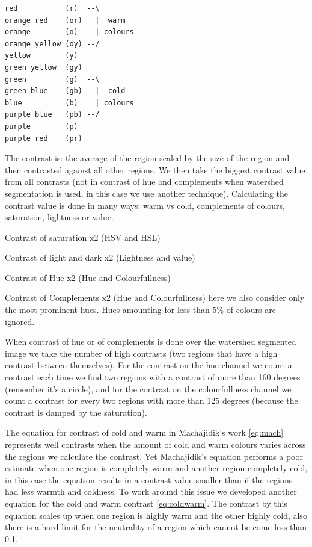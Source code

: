 \documentclass[11pt,a4paper,draft]{report}
\begin{document}
\begin{multicols}{2}
\begin{verbatim}
red           (r)  --\
orange red    (or)   |  warm
orange        (o)    | colours
orange yellow (oy) --/
yellow        (y)
green yellow  (gy)
green         (g)  --\
green blue    (gb)   |  cold
blue          (b)    | colours
purple blue   (pb) --/
purple        (p)
purple red    (pr)
\end{verbatim}


The contrast is: the average of the region scaled by the size of the region and
then contrasted against all other regions.  We then take the biggest contrast
value from all contrasts (not in contrast of hue and complements when watershed
segmentation is used, in this case we use another technique).  Calculating the
contrast value is done in many ways: warm vs cold, complements of colours,
saturation, lightness or value.

Contrast of saturation x2 (HSV and HSL)

Contrast of light and dark x2 (Lightness and value)

Contrast of Hue x2 (Hue and Colourfullness)

Contrast of Complements x2 (Hue and Colourfullness) here we also consider only
the most prominent hues.  Hues amounting for less than 5\% of colours are
ignored.

When contrast of hue or of complements is done over the watershed segmented
image we take the number of high contrasts (two regions that have a high
contrast between themselves).  For the contrast on the hue channel we count a
contrast each time we find two regions with a contrast of more than 160 degrees
(remember it's a circle), and for the contrast on the colourfullness channel we
count a contrast for every two regions with more than 125 degrees (because the
contrast is damped by the saturation).

The equation for contrast of cold and warm in Machajidik's work \ref{eq:mach}
represents well contrasts when the amount of cold and warm colours varies
across the regions we calculate the contrast.  Yet Machajidik's equation
performs a poor estimate when one region is completely warm and another region
completely cold, in this case the equation results in a contrast value smaller
than if the regions had less warmth and coldness.  To work around this issue we
developed another equation for the cold and warm contrast \ref{eq:coldwarm}.
The contrast by this equation scales up when one region is highly warm and the
other highly cold, also there is a hard limit for the neutrality of a region
which cannot be come less than 0.1.


\end{multicols}
\end{document}
